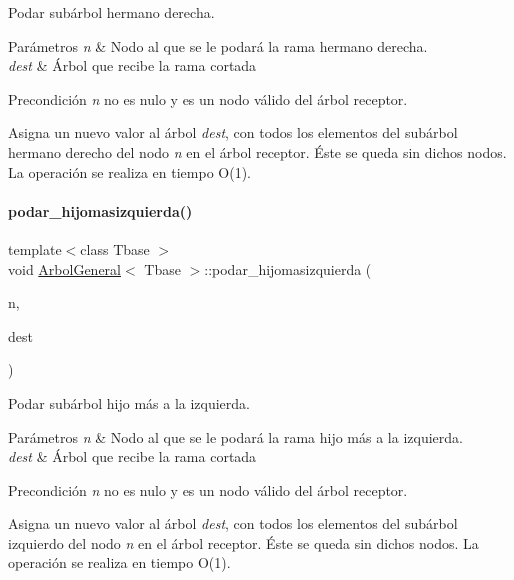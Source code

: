 Podar subárbol hermano derecha. 


\begin{DoxyParams}{Parámetros}
{\em n} & Nodo al que se le podará la rama hermano derecha. \\
\hline
{\em dest} & Árbol que recibe la rama cortada \\
\hline
\end{DoxyParams}
\begin{DoxyPrecond}{Precondición}
{\itshape n} no es nulo y es un nodo válido del árbol receptor.
\end{DoxyPrecond}
Asigna un nuevo valor al árbol {\itshape dest}, con todos los elementos del subárbol hermano derecho del nodo {\itshape n} en el árbol receptor. Éste se queda sin dichos nodos. La operación se realiza en tiempo O(1). \hypertarget{classArbolGeneral_a7f2fa2d9be4af4b7be1c334819a04c39}{}\label{classArbolGeneral_a7f2fa2d9be4af4b7be1c334819a04c39} 
\paragraph{\texorpdfstring{podar\+\_\+hijomasizquierda()}{podar\_hijomasizquierda()}}
{\footnotesize\ttfamily template$<$class Tbase $>$ \\
void \hyperlink{classArbolGeneral}{Arbol\+General}$<$ Tbase $>$\+::podar\+\_\+hijomasizquierda (\begin{DoxyParamCaption}\item[{\hyperlink{classArbolGeneral_a12cc1b74a9095d89bc7334290d332f7a}{Nodo}}]{n,  }\item[{\hyperlink{classArbolGeneral}{Arbol\+General}$<$ Tbase $>$ \&}]{dest }\end{DoxyParamCaption})}



Podar subárbol hijo más a la izquierda. 


\begin{DoxyParams}{Parámetros}
{\em n} & Nodo al que se le podará la rama hijo más a la izquierda. \\
\hline
{\em dest} & Árbol que recibe la rama cortada \\
\hline
\end{DoxyParams}
\begin{DoxyPrecond}{Precondición}
{\itshape n} no es nulo y es un nodo válido del árbol receptor.
\end{DoxyPrecond}
Asigna un nuevo valor al árbol {\itshape dest}, con todos los elementos del subárbol izquierdo del nodo {\itshape n} en el árbol receptor. Éste se queda sin dichos nodos. La operación se realiza en tiempo O(1). \hypertarget{classArbolGeneral_a7604d8f20552803253132bdaff134f18}{}\label{classArbolGeneral_a7604d8f20552803253132bdaff134f18} 
